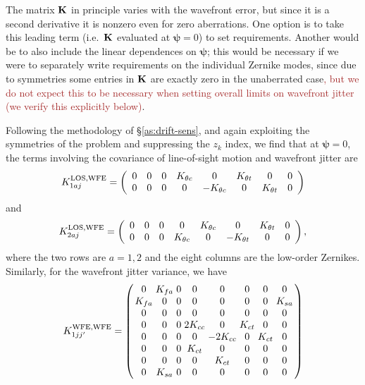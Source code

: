 \documentclass[usenatbib]{mnras}
\newcommand{\changetext}[1]{\textcolor{brown}{#1}}
\begin{document}
The matrix ${\bf K}$ in principle varies with the wavefront error, but
since it is a second derivative it is nonzero even for zero
aberrations. One option is to take this leading term (i.e.\ ${\bf K}$
evaluated at ${\boldsymbol\psi}=0$) to set requirements. Another would
be to also include the linear dependences on ${\boldsymbol\psi}$; this
would be necessary if we were to separately write requirements on the
individual Zernike modes, since due to symmetries some entries in
${\bf K}$ are exactly zero in the unaberrated case\changetext{, but we do not expect this to be necessary when setting overall limits on wavefront jitter (we verify this explicitly below)}.

Following the methodology of \S\ref{as:drift-sens}, and again
exploiting the symmetries of the problem and suppressing the $z_k$
index, we find that at ${\boldsymbol\psi}=0$, the terms involving the
covariance of line-of-sight motion and wavefront jitter are
\begin{equation}
K_{1aj}^{\rm LOS,WFE} = \left( \begin{array}{cccccccc}
0 & 0 & 0 & K_{\theta c} & 0 & K_{\theta t} & 0 & 0 \\
0 & 0 & 0 & 0 & -K_{\theta c} & 0 & K_{\theta t} & 0
\end{array} \right)
\label{eq:temp.078524}
\end{equation}
and
\begin{equation}
K_{2aj}^{\rm LOS,WFE} = \left( \begin{array}{cccccccc}
0 & 0 & 0 & 0 & K_{\theta c} & 0 & K_{\theta t} & 0 \\
0 & 0 & 0 & K_{\theta c} & 0 & -K_{\theta t} & 0 & 0
\end{array} \right),
\end{equation}
where the two rows are $a=1,2$ and the eight columns are the low-order
Zernikes. Similarly, for the wavefront jitter variance, we have
\begin{equation}
\setlength\arraycolsep{1.5pt}
K_{1jj'}^{\rm WFE,WFE} = \left( \begin{array}{cccccccc}
0 & K_{fa} & 0 & 0 & 0 & 0 & 0 & 0 \\
K_{fa} & 0 & 0 & 0 & 0 & 0 & 0 & K_{sa} \\
0 & 0 & 0 & 0 & 0 & 0 & 0 & 0 \\
0 & 0 & 0 & 2K_{cc} & 0 & K_{ct} & 0 & 0 \\
0 & 0 & 0 & 0 & -2K_{cc} & 0 & K_{ct} & 0 \\
0 & 0 & 0 & K_{ct} & 0 & 0 & 0 & 0 \\
0 & 0 & 0 & 0 & K_{ct} & 0 & 0 & 0 \\
0 & K_{sa} & 0 & 0 & 0 & 0 & 0 & 0 \\
\end{array} \right)
\end{equation}
\end{document}
